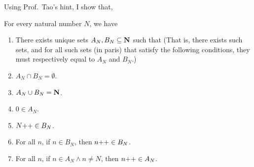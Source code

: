 Using Prof.~Tao's hint, I show that, 
\begin{lem}
	For every natural number $N$, we have
	\begin{enumerate}
		\item There exists unique sets $A_N, B_N \subseteq \mathbf{N}$ such that (That is, there exists such sets, and for all such sets (in paris) that satisfy the following conditions, they must respectively equal to $A_N$ and $B_N$.) 
			\label{exer.3.5.12.2nd.cond.1}
		\item $A_N \cap B_N = \emptyset$. 
			\label{exer.3.5.12.2nd.cond.2}
		\item $A_N \cup B_N = \mathbf{N}$. 
			\label{exer.3.5.12.2nd.cond.3}
		\item $0 \in A_N$. 
			\label{exer.3.5.12.2nd.cond.4}
		\item $N{+}{+} \in B_N$. 
			\label{exer.3.5.12.2nd.cond.5}
		\item For all $n$, if $n \in B_N$, then $n{+}{+} \in B_N$. 
			\label{exer.3.5.12.2nd.cond.6}
		\item For all $n$, if $n \in A_N \wedge n \ne N$, then $n{+}{+} \in A_N$. 
			\label{exer.3.5.12.2nd.cond.7}
	\end{enumerate}
\end{lem}

